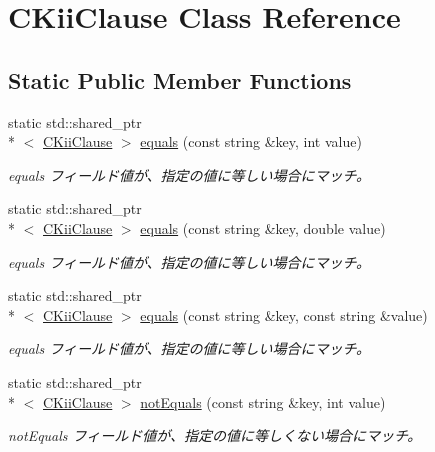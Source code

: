 \hypertarget{class_c_kii_clause}{\section{C\-Kii\-Clause Class Reference}
\label{class_c_kii_clause}
}
\subsection*{Static Public Member Functions}
\begin{DoxyCompactItemize}
\item 
static std\-::shared\-\_\-ptr\\*
$<$ \hyperlink{class_c_kii_clause}{C\-Kii\-Clause} $>$ \hyperlink{class_c_kii_clause_a31aa4b7f40cde23d8da1eefc69089a10}{equals} (const string \&key, int value)
\begin{DoxyCompactList}\small\item\em equals フィールド値が、指定の値に等しい場合にマッチ。 \end{DoxyCompactList}\item 
static std\-::shared\-\_\-ptr\\*
$<$ \hyperlink{class_c_kii_clause}{C\-Kii\-Clause} $>$ \hyperlink{class_c_kii_clause_a7b1e1efd3ebf56c6ca619ee66b9ee2ab}{equals} (const string \&key, double value)
\begin{DoxyCompactList}\small\item\em equals フィールド値が、指定の値に等しい場合にマッチ。 \end{DoxyCompactList}\item 
static std\-::shared\-\_\-ptr\\*
$<$ \hyperlink{class_c_kii_clause}{C\-Kii\-Clause} $>$ \hyperlink{class_c_kii_clause_a514ad24cf5ace4f80e4d4eac4dd7166a}{equals} (const string \&key, const string \&value)
\begin{DoxyCompactList}\small\item\em equals フィールド値が、指定の値に等しい場合にマッチ。 \end{DoxyCompactList}\item 
static std\-::shared\-\_\-ptr\\*
$<$ \hyperlink{class_c_kii_clause}{C\-Kii\-Clause} $>$ \hyperlink{class_c_kii_clause_a14e15cd786186cdd0de6a988b1271c7d}{not\-Equals} (const string \&key, int value)
\begin{DoxyCompactList}\small\item\em not\-Equals フィールド値が、指定の値に等しくない場合にマッチ。 \end{DoxyCompactList}\item 

\end{DoxyCompactItemize}
